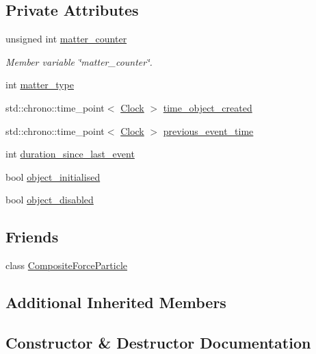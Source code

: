 \subsection*{Private Attributes}
\begin{DoxyCompactItemize}
\item 
unsigned int \mbox{\hyperlink{classMatter_aaa9afd2c589feed49f7ac3c8ba1e2ae1}{matter\+\_\+counter}}
\begin{DoxyCompactList}\small\item\em Member variable \char`\"{}matter\+\_\+counter\char`\"{}. \end{DoxyCompactList}\item 
int \mbox{\hyperlink{classMatter_a03bdd796ec849635193fea2f7e6c3e03}{matter\+\_\+type}}
\item 
std\+::chrono\+::time\+\_\+point$<$ \mbox{\hyperlink{universe_8h_a0ef8d951d1ca5ab3cfaf7ab4c7a6fd80}{Clock}} $>$ \mbox{\hyperlink{classMatter_abce05beb1ad51f3b4bddefcd35731a2f}{time\+\_\+object\+\_\+created}}
\item 
std\+::chrono\+::time\+\_\+point$<$ \mbox{\hyperlink{universe_8h_a0ef8d951d1ca5ab3cfaf7ab4c7a6fd80}{Clock}} $>$ \mbox{\hyperlink{classMatter_a4e4a62161c81e4c2ba70b3ff41b95b56}{previous\+\_\+event\+\_\+time}}
\item 
int \mbox{\hyperlink{classMatter_af50b6a357e77f2cd81264234148686ba}{duration\+\_\+since\+\_\+last\+\_\+event}}
\item 
bool \mbox{\hyperlink{classMatter_a570c6b0584f1e67d24f0a7661d3cc790}{object\+\_\+initialised}}
\item 
bool \mbox{\hyperlink{classMatter_a51eb653f21084e8d7494ea87059072ea}{object\+\_\+disabled}}
\end{DoxyCompactItemize}
\subsection*{Friends}
\begin{DoxyCompactItemize}
\item 
class \mbox{\hyperlink{classMatter_a9bc6eb2a4c20ce83728a7c9a31b91f19}{Composite\+Force\+Particle}}
\end{DoxyCompactItemize}
\subsection*{Additional Inherited Members}


\subsection{Constructor \& Destructor Documentation}
\mbox{\label{classMatter_ac2dc2f5eeef03d3bdf41a68334ae49b4}} 
